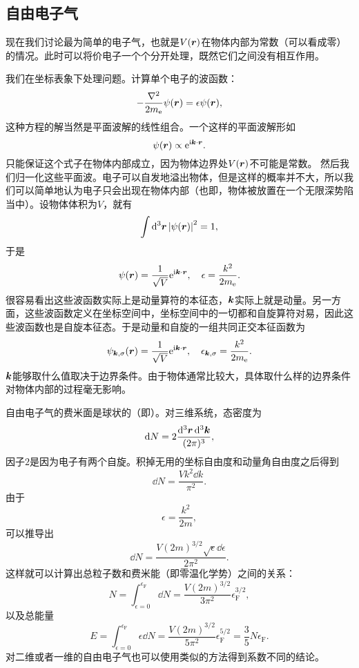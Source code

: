 \subsection{自由电子气}

现在我们讨论最为简单的电子气，也就是$V(\vb*{r})$在物体内部为常数（可以看成零）的情况。此时可以将价电子一个个分开处理，既然它们之间没有相互作用。

我们在坐标表象下处理问题。计算单个电子的波函数：
\[
    - \frac{\laplacian}{2m_\text{e}} \psi(\vb*{r}) = \epsilon \psi(\vb*{r}),
\]
这种方程的解当然是平面波解的线性组合。一个这样的平面波解形如
\[
    \psi(\vb*{r}) \propto \mathrm{e}^{\mathrm{i} \vb*{k} \cdot \vb*{r}}.
\]
只能保证这个式子在物体内部成立，因为物体边界处$V(\vb*{r})$不可能是常数。
然后我们归一化这些平面波。电子可以自发地溢出物体，但是这样的概率并不大，所以我们可以简单地认为电子只会出现在物体内部（也即，物体被放置在一个无限深势陷当中）。设物体体积为$V$，就有
\[
    \int \dd[3]{\vb*{r}} \abs{\psi(\vb*{r})}^2 = 1,
\]
于是
\[
    \psi (\vb*{r}) = \frac{1}{\sqrt{V}} \mathrm{e}^{\mathrm{i} \vb*{k} \cdot \vb*{r}}, \quad \epsilon = \frac{k^2}{2m_\text{e}}.
\]
很容易看出这些波函数实际上是动量算符的本征态，$\vb*{k}$实际上就是动量。另一方面，这些波函数定义在坐标空间中，坐标空间中的一切都和自旋算符对易，因此这些波函数也是自旋本征态。于是动量和自旋的一组共同正交本征函数为
\begin{equation}
    \psi_{\vb*{k},\sigma} (\vb*{r}) = \frac{1}{\sqrt{V}} \mathrm{e}^{\mathrm{i} \vb*{k} \cdot \vb*{r}}, \quad \epsilon_{\vb*{k},\sigma} = \frac{k^2}{2m_\text{e}}.
\end{equation}
$\vb*{k}$能够取什么值取决于边界条件。由于物体通常比较大，具体取什么样的边界条件对物体内部的过程毫无影响。

自由电子气的费米面是球状的（即）。对三维系统，态密度为
\[
    \dd{N} = 2 \frac{\dd[3]{\vb*{r}} \dd[3]{\vb*{k}}}{(2\pi)^3},
\]
因子$2$是因为电子有两个自旋。积掉无用的坐标自由度和动量角自由度之后得到
\[
    \dd{N} = \frac{V k^2 \dd{k}}{\pi^2}.
\]
由于
\[
    \epsilon = \frac{k^2}{2m},
\]
可以推导出
\[
    \dd{N} = \frac{V (2m)^{3/2} \sqrt{\epsilon} \dd{\epsilon}}{2 \pi^2}.
\]
这样就可以计算出总粒子数和费米能（即零温化学势）之间的关系：
\begin{equation}
    N = \int_{\epsilon=0}^{\epsilon_{\text{F}}} \dd{N} = \frac{V (2m)^{3/2}}{3 \pi^2} \epsilon_\text{F}^{3/2},
\end{equation}
以及总能量
\begin{equation}
    E = \int_{\epsilon=0}^{\epsilon_{\text{F}}} \epsilon \dd{N} = \frac{V (2m)^{3/2}}{5 \pi^2} \epsilon_\text{F}^{5/2} = \frac{3}{5} N \epsilon_{\text{F}}.
\end{equation}
对二维或者一维的自由电子气也可以使用类似的方法得到系数不同的结论。

